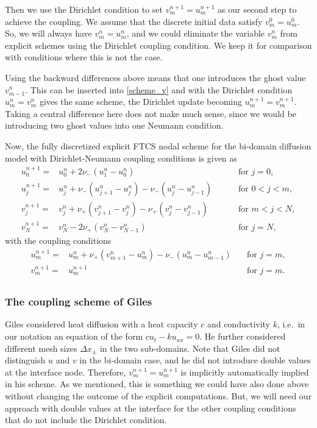 Then we use the Dirichlet condition to set $v_m^{n+1}=u_m^{n+1}$ as our second step to achieve the coupling.
We assume that the discrete initial data satisfy $v_m^0=u_m^0$. So, we will always have $v_m^n=u_m^n$, and
we could eliminate the variable $v_m^n$ from explicit schemes using the Dirichlet coupling condition.
We keep it for comparison with conditions where this is not the case.

Using the backward differences above means that one introduces the ghost value $v_{m-1}^n$. This can be inserted
into \eqref{scheme_v} and with the Dirichlet condition $u_m^n=v_m^n$ gives the same scheme, the Dirichlet update
becoming $u_m^{n+1}=v_m^{n+1}$. Taking a central difference here does not make much sense, since we would be introducing
two ghost values into one Neumann condition.

Now, the fully discretized explicit FTCS nodal scheme for the bi-domain diffusion model with Dirichlet-Neumann
coupling conditions is given as 
%
\begin{eqnarray}
\label{scheme_c1}
u_{0}^{n+1}=&u_{0}^n+2\nu_- (u_{1}^{n}-u_{0}^n) \quad\qquad\qquad\qquad\qquad&\quad\mbox{for $j=0$},\nonumber \\
u_{j}^{n+1}=&u_j^n +\nu_-( u_{j+1}^{n}-u^n_j) -\nu_-(u_j^n-u^n_{j-1}) \;\quad&\quad\mbox{for $0<j<m$},\nonumber \\
v_{j}^{n+1}=&v_j^n+\nu_+ (v_{j+1}^{n}-v^{n}_j)-\nu_+(v_j^n-v^n_{j-1})\;\quad &\quad\mbox{for $m<j<N$}, \nonumber \\
v_{N}^{n+1}=&v_{N}^n-2\nu_+ (v_{N}^{n}-v_{N-1}^n) \quad\qquad\qquad\qquad&\quad\mbox{for $j=N$},
\end{eqnarray}
%
with the coupling conditions
%
\begin{eqnarray}
\label{dn_disc}
u_{m}^{n+1}=& u^n_{m}+\nu_{+}(v^n_{m+1}-u^n_{m})-\nu_- (u^n_{m}-u^n_{m-1})& \quad \mbox{for $j=m$},\nonumber \\
v^{n+1}_m=&u^{n+1}_m  \quad\qquad\qquad\qquad\qquad\qquad\qquad\qquad&\quad\mbox{for $j=m$}.\nonumber \\
\end{eqnarray}

%
%
\subsubsection*{The coupling scheme of Giles}
%
%

Giles \cite{GIL} considered heat diffusion with a heat capacity $c$ and conductivity $k$, i.e.\ in our notation an
equation of the form $cu_t-ku_{xx}=0$. He further considered 
different mesh sizes $\Delta x_{\pm}$ in the two sub-domains. 
Note that Giles \cite[Eq.~(26)]{GIL} did not distinguish $u$ and $v$ in the bi-domain case, and he did not
introduce double values at the interface node. Therefore, 
$v^{n+1}_m=u^{n+1}_m$ is implicitly automatically implied in his 
scheme. As we mentioned, this is something we could have also done above without changing the outcome of the explicit computations. 
But, we will need our approach with double values at the interface for the other 
coupling conditions that do not include the Dirichlet condition.

